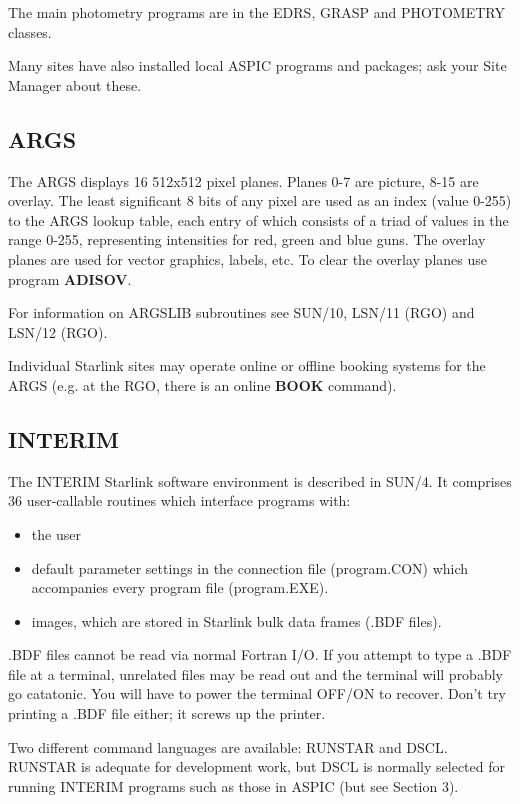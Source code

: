 The main photometry programs are in the EDRS, GRASP and PHOTOMETRY classes.

Many sites have also installed local ASPIC programs and packages; ask your
Site Manager about these.

\subsection{ARGS}

The ARGS displays 16 512x512 pixel planes.
Planes 0-7 are picture, 8-15 are overlay.
The least significant 8 bits of any pixel are used as an index (value 0-255)
to the ARGS lookup table, each entry of which consists of a triad of values
in the range 0-255, representing intensities for red, green and blue guns.
The overlay planes are used for vector graphics, labels, etc.
To clear the overlay planes use program {\bf ADISOV}.

For information on ARGSLIB subroutines see SUN/10, LSN/11 (RGO) and
LSN/12 (RGO).

Individual Starlink sites may operate online or offline
booking systems for the ARGS
(e.g. at the RGO, there is an online {\bf BOOK} command).

\subsection{INTERIM}

The INTERIM Starlink software environment is described in SUN/4.
It comprises 36 user-callable routines which interface programs with:
\begin{itemize}
\item the user
\item default parameter settings in the connection file (program.CON) which
accompanies every program file (program.EXE).
\item images, which are stored in Starlink bulk data frames (.BDF files).
\end{itemize}
.BDF files cannot be read via normal Fortran I/O.
If you attempt to type a .BDF file at a terminal, unrelated files may be read out
and the terminal will probably go catatonic.
You will have to power the terminal OFF/ON to recover.
Don't try printing a .BDF file either; it screws up the printer.

Two different command languages are available: RUNSTAR and DSCL.
RUNSTAR is adequate for development work, but DSCL is normally selected for
running INTERIM programs such as those in ASPIC
(but see Section 3).

